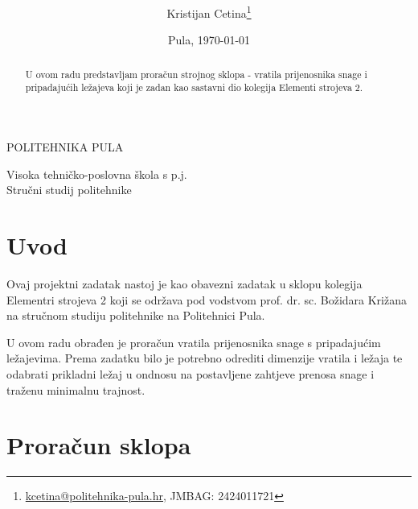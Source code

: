 \documentclass[11pt,a4paper]{article}
\author{Kristijan Cetina\footnote{\href{mailto:kcetina@politehnika-pula.hr?subject=\mailFriendlynaslovRada}{kcetina@politehnika-pula.hr}, JMBAG: 2424011721}}
\title{\kolegij \\ \naslovRada}
\date{Pula, \today}
\begin{document}
\begin{titlepage}
\clearpage
\begin{center}
\begin{Huge}
POLITEHNIKA PULA\\
\end{Huge}
\begin{LARGE}
Visoka tehničko-poslovna škola s p.j.\\
Stručni studij politehnike\\
\end{LARGE}
\end{center}
\vspace{3cm}
{\let\newpage\relax\maketitle}
\thispagestyle{empty}
\vfill
\begin{abstract}
U ovom radu predstavljam proračun strojnog sklopa - vratila prijenosnika snage i pripadajućih ležajeva koji je zadan kao sastavni dio kolegija Elementi strojeva 2.
\end{abstract}
\end{titlepage}

\tableofcontents

\newpage
\section{Uvod}
Ovaj projektni zadatak nastoj je kao obavezni zadatak u sklopu kolegija Elementri strojeva 2 koji se održava pod vodstvom prof. dr. sc. Božidara Križana na stručnom studiju politehnike na Politehnici Pula.

U ovom radu obrađen je proračun vratila prijenosnika snage s pripadajućim ležajevima. Prema zadatku bilo je potrebno odrediti dimenzije vratila i ležaja te odabrati prikladni ležaj u ondnosu na postavljene zahtjeve prenosa snage i traženu minimalnu trajnost.

\newpage
\section{Proračun sklopa}
\end{document}
